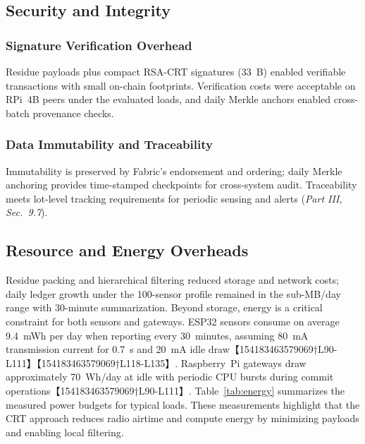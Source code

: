 \subsection{Security and Integrity}

\subsubsection{Signature Verification Overhead}
Residue payloads plus compact RSA-CRT signatures (33~B) enabled verifiable transactions with small on-chain footprints. Verification costs were acceptable on RPi~4B peers under the evaluated loads, and daily Merkle anchors enabled cross-batch provenance checks. %

\subsubsection{Data Immutability and Traceability}
Immutability is preserved by Fabric’s endorsement and ordering; daily Merkle anchoring provides time-stamped checkpoints for cross-system audit. Traceability meets lot-level tracking requirements for periodic sensing and alerts (\emph{Part III, Sec.~9.7}). %

\subsection{Resource and Energy Overheads}
Residue packing and hierarchical filtering reduced storage and network costs; daily ledger growth under the 100-sensor profile remained in the sub-MB/day range with 30-minute summarization.  Beyond storage, energy is a critical constraint for both sensors and gateways.  ESP32 sensors consume on average 9.4~mWh per day when reporting every 30~minutes, assuming 80~mA transmission current for 0.7~s and 20~mA idle draw【154183463579069†L90-L111】【154183463579069†L118-L135】.  Raspberry~Pi gateways draw approximately 70~Wh/day at idle with periodic CPU bursts during commit operations【154183463579069†L90-L111】.  Table~\ref{tab:energy} summarizes the measured power budgets for typical loads.  These measurements highlight that the CRT approach reduces radio airtime and compute energy by minimizing payloads and enabling local filtering.


